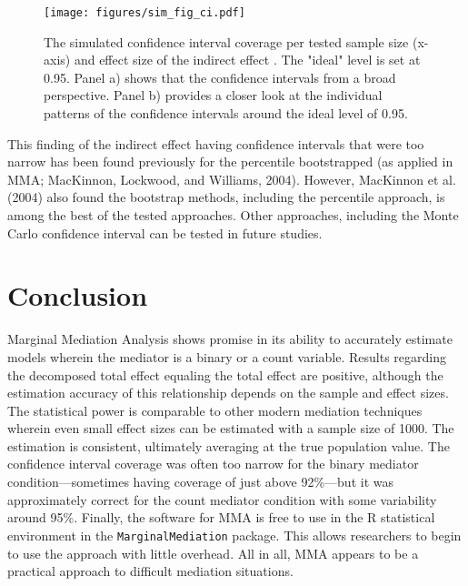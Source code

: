 \documentclass[]{DissertateUSU}
\begin{document}
\begin{figure}[tb]
\centering
\texttt{[image: figures/sim\_fig\_ci.pdf]}
\caption{The simulated confidence interval coverage per tested sample size (x-axis) and effect size of the indirect effect . The "ideal" level is set at 0.95. Panel a) shows that the confidence intervals from a broad perspective. Panel b) provides a closer look at the individual patterns of the confidence intervals around the ideal level of 0.95.}
\label{fig_ci}
\end{figure}

This finding of the indirect effect having confidence intervals that
were too narrow has been found previously for the percentile
bootstrapped (as applied in MMA; MacKinnon, Lockwood, and Williams,
2004). However, MacKinnon et al. (2004) also found the bootstrap
methods, including the percentile approach, is among the best of the
tested approaches. Other approaches, including the Monte Carlo
confidence interval can be tested in future studies.

\section{Conclusion}\label{conclusion}

Marginal Mediation Analysis shows promise in its ability to accurately
estimate models wherein the mediator is a binary or a count variable.
Results regarding the decomposed total effect equaling the total effect
are positive, although the estimation accuracy of this relationship
depends on the sample and effect sizes. The statistical power is
comparable to other modern mediation techniques wherein even small
effect sizes can be estimated with a sample size of 1000. The estimation
is consistent, ultimately averaging at the true population value. The
confidence interval coverage was often too narrow for the binary
mediator condition---sometimes having coverage of just above 92\%---but
it was approximately correct for the count mediator condition with some
variability around 95\%. Finally, the software for MMA is free to use in
the R statistical environment in the \texttt{MarginalMediation} package.
This allows researchers to begin to use the approach with little
overhead. All in all, MMA appears to be a practical approach to
difficult mediation situations.

\singlespacing

\FloatBarrier

\newpage

 \fancyhead[R]{\thepage} \fancyfoot[C]{}
\end{document}
